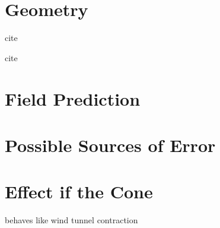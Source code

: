 \label{sec:field}

\section{Geometry}

cite

cite

\section{Field Prediction}

\section{Possible Sources of Error}

\section{Effect if the Cone}

behaves like wind tunnel contraction